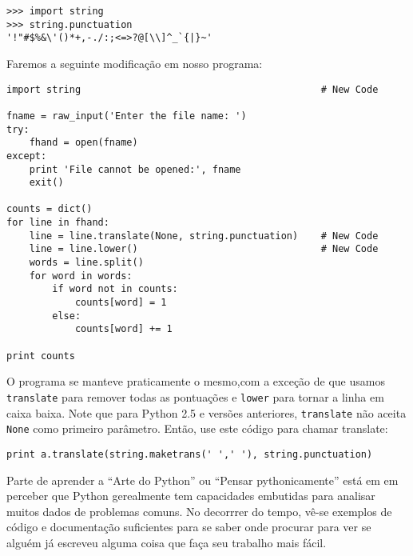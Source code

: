\beforeverb
\begin{verbatim}
>>> import string
>>> string.punctuation
'!"#$%&\'()*+,-./:;<=>?@[\\]^_`{|}~'
\end{verbatim}
\afterverb
%
Faremos a seguinte modificação em nosso programa:

\beforeverb
\begin{verbatim}
import string                                          # New Code

fname = raw_input('Enter the file name: ')
try:
    fhand = open(fname)
except:
    print 'File cannot be opened:', fname
    exit()

counts = dict()
for line in fhand:
    line = line.translate(None, string.punctuation)    # New Code
    line = line.lower()                                # New Code
    words = line.split()
    for word in words:
        if word not in counts:
            counts[word] = 1
        else:
            counts[word] += 1

print counts
\end{verbatim}
\afterverb
%
O programa se manteve praticamente o mesmo,com a exceção de que usamos {\tt translate} para remover todas as pontuações e {\tt lower} para tornar a linha em caixa baixa.
Note que para Python 2.5 e versões anteriores, {\tt translate} não aceita {\tt None} como primeiro parâmetro. Então, use este código para chamar translate:

\beforeverb
\begin{verbatim}
print a.translate(string.maketrans(' ',' '), string.punctuation)
\end{verbatim}
\afterverb
%
Parte de aprender a ``Arte do Python'' ou ``Pensar pythonicamente'' está em em
perceber que Python gerealmente tem capacidades embutidas para analisar muitos
dados de problemas comuns. No decorrrer do tempo, vê-se exemplos de código e
documentação suficientes para se saber onde procurar para ver se alguém já escreveu alguma coisa que faça seu trabalho mais fácil.

